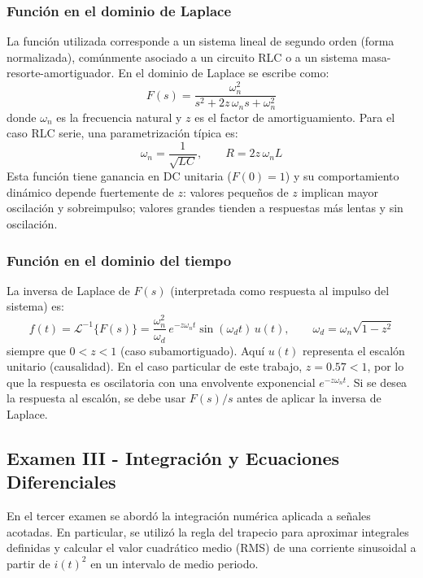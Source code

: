 \documentclass[pdflatex,sn-mathphys-num]{sn-jnl}%
\begin{document}
\subsubsection{Función en el dominio de Laplace}
La función utilizada corresponde a un sistema lineal de segundo orden (forma normalizada), comúnmente asociado a un circuito RLC o a un sistema masa-resorte-amortiguador. En el dominio de Laplace se escribe como:
\begin{equation}
F(s)=\frac{\omega_n^{2}}{s^{2}+2z\,\omega_n s+\omega_n^{2}}
\end{equation}
donde $\omega_n$ es la frecuencia natural y $z$ es el factor de amortiguamiento. Para el caso RLC serie, una parametrización típica es:
\begin{equation}
\omega_n=\frac{1}{\sqrt{LC}},\qquad R=2z\,\omega_n L
\end{equation}
Esta función tiene ganancia en DC unitaria ($F(0)=1$) y su comportamiento dinámico depende fuertemente de $z$: valores pequeños de $z$ implican mayor oscilación y sobreimpulso; valores grandes tienden a respuestas más lentas y sin oscilación.

\subsubsection{Función en el dominio del tiempo}
La inversa de Laplace de $F(s)$ (interpretada como respuesta al impulso del sistema) es:
\begin{equation}
f(t)=\mathcal{L}^{-1}\{F(s)\}=\frac{\omega_n^{2}}{\omega_d}\,e^{-z\omega_n t}\sin(\omega_d t)\,u(t),\qquad \omega_d=\omega_n\sqrt{1-z^{2}}
\end{equation}
siempre que $0<z<1$ (caso subamortiguado). Aquí $u(t)$ representa el escalón unitario (causalidad). En el caso particular de este trabajo, $z=0.57<1$, por lo que la respuesta es oscilatoria con una envolvente exponencial $e^{-z\omega_n t}$. Si se desea la respuesta al escalón, se debe usar $F(s)/s$ antes de aplicar la inversa de Laplace.

\subsection{Examen III - Integración y Ecuaciones Diferenciales}
En el tercer examen se abordó la integración numérica aplicada a señales acotadas. En particular, se utilizó la regla del trapecio para aproximar integrales definidas y calcular el valor cuadrático medio (RMS) de una corriente sinusoidal a partir de $i(t)^2$ en un intervalo de medio periodo.
\end{document}
